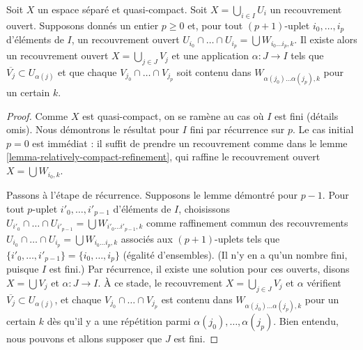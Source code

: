 \begin{lemma}
\label{lemma-refine-covering}
Soit $X$ un espace séparé et quasi-compact.
Soit $X = \bigcup_{i \in I} U_i$ un recouvrement ouvert.
Supposons donnés un entier $p \geq 0$ et, pour tout $(p + 1)$-uplet
$i_0, \ldots, i_p$ d'éléments de $I$, un recouvrement ouvert
$U_{i_0} \cap \ldots \cap U_{i_p} = \bigcup W_{i_0 \ldots i_p, k}$.
Il existe alors un recouvrement ouvert $X = \bigcup_{j \in J} V_j$ et une
application $\alpha : J \to I$ tels que $\overline{V_j} \subset U_{\alpha(j)}$
et que chaque $V_{j_0} \cap \ldots \cap V_{j_p}$ soit contenu dans
$W_{\alpha(j_0) \ldots \alpha(j_p), k}$ pour un certain $k$.
\end{lemma}

\begin{proof}
Comme $X$ est quasi-compact, on se ramène au cas où $I$ est fini (détails
omis). Nous démontrons le résultat pour $I$ fini par récurrence sur $p$.
Le cas initial $p = 0$ est immédiat : il suffit de prendre un recouvrement
comme dans le lemme \ref{lemma-relatively-compact-refinement}, qui raffine le
recouvrement ouvert $X = \bigcup W_{i_0, k}$.

\medskip\noindent
Passons à l'étape de récurrence. Supposons le lemme démontré pour $p - 1$.
Pour tout $p$-uplet $i'_0, \ldots, i'_{p - 1}$ d'éléments de $I$, choisissons
$U_{i'_0} \cap \ldots \cap U_{i'_{p - 1}} =
\bigcup W_{i'_0 \ldots i'_{p - 1}, k}$ comme raffinement commun des
recouvrements
$U_{i_0} \cap \ldots \cap U_{i_p} = \bigcup W_{i_0 \ldots i_p, k}$ associés
aux $(p + 1)$-uplets tels que
$\{i'_0, \ldots, i'_{p - 1}\} = \{i_0, \ldots, i_p\}$ (égalité d'ensembles).
(Il n'y en a qu'un nombre fini, puisque $I$ est fini.)
Par récurrence, il existe une solution pour ces ouverts, disons
$X = \bigcup V_j$ et $\alpha : J \to I$.
À ce stade, le recouvrement $X = \bigcup_{j \in J} V_j$ et $\alpha$ vérifient
$\overline{V_j} \subset U_{\alpha(j)}$, et chaque
$V_{j_0} \cap \ldots \cap V_{j_p}$ est contenu dans
$W_{\alpha(j_0) \ldots \alpha(j_p), k}$ pour un certain $k$ dès qu'il y a une
répétition parmi $\alpha(j_0), \ldots, \alpha(j_p)$. Bien entendu, nous pouvons
et allons supposer que $J$ est fini.


\end{proof}
